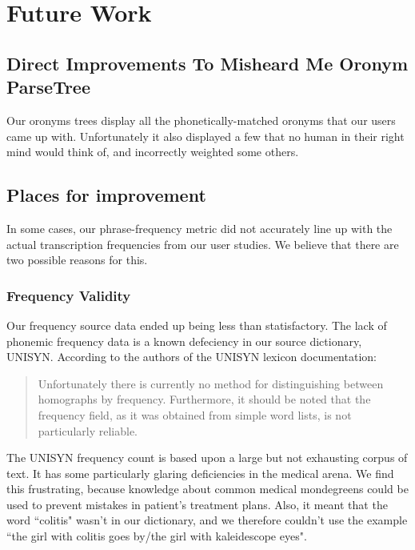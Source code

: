 \chapter{Future Work}
\label{futureWork}

\section{Direct Improvements To Misheard Me Oronym ParseTree}
\label{section:directImprovementsToMisheardMeOronymParseTree}


Our oronyms trees display all the phonetically-matched oronyms that our users came up with. Unfortunately it also displayed a few that no human in their right mind would think of, and incorrectly weighted some others. 


\section{Places for improvement}
In some cases, our phrase-frequency metric did not accurately line up with the actual transcription frequencies from our user studies.  We believe that there are two possible reasons for this.  

\subsection{Frequency Validity}
\label{subsection: frequencyValidity}
Our frequency source data ended up being less than statisfactory. The lack of phonemic frequency data is a known defeciency in our source dictionary, UNISYN. According to the authors of the UNISYN lexicon documentation:
\begin{quote}
Unfortunately there is currently no method for distinguishing between homographs by frequency. Furthermore, it should be noted that the frequency field, as it was obtained from simple word lists, is not particularly reliable. 
\end{quote}\cite{fitt_documentation_2000} The UNISYN frequency count is based upon a large but not exhausting corpus of text.  It has some particularly glaring deficiencies in the medical arena.  We find this frustrating, because knowledge about common medical mondegreens could be used to prevent mistakes in patient's treatment plans\cite{medicalMondegreensWhenIUseAWord}. Also, it meant that the word ``colitis" wasn't in our dictionary, and we therefore couldn't use the example ``the girl with colitis goes by/the girl with kaleidescope eyes". 

